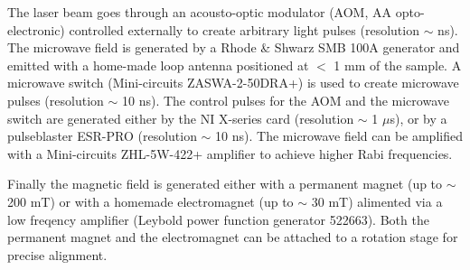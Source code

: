 \documentclass[a4paper, 11pt]{report}
\begin{document}
The laser beam goes through an acousto-optic modulator (AOM, AA opto-electronic) controlled externally to create arbitrary light pulses (resolution $\sim$ ns). The microwave field is generated by a Rhode \& Shwarz SMB 100A generator and emitted with a home-made loop antenna positioned at $<$ 1 mm of the sample. A microwave switch (Mini-circuits ZASWA-2-50DRA+) is used to create microwave pulses (resolution $\sim$ 10 ns). The control pulses for the AOM and the microwave switch are generated either by the NI X-series card (resolution $\sim$ 1 $\mu$s), or by a pulseblaster ESR-PRO (resolution $\sim$ 10 ns). The microwave field can be amplified with a Mini-circuits ZHL-5W-422+ amplifier to achieve higher Rabi frequencies. 

Finally the magnetic field is generated either with a permanent magnet (up to $\sim$ 200 mT) or with a homemade electromagnet (up to $\sim$ 30 mT) alimented via a low freqency amplifier (Leybold power function generator 522663). Both the permanent magnet and the electromagnet can be  attached to a rotation stage for precise alignment.
\end{document}
